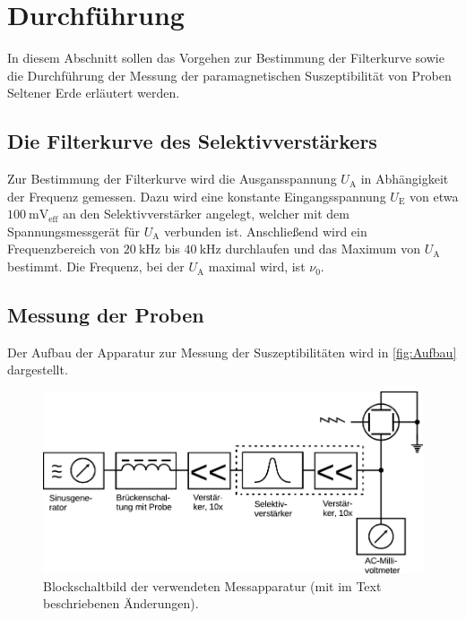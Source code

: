 \section{Durchführung}

    In diesem Abschnitt sollen
    das Vorgehen zur Bestimmung der Filterkurve
    sowie die Durchführung der Messung der paramagnetischen Suszeptibilität von Proben Seltener Erde
    erläutert werden.

\subsection{Die Filterkurve des Selektivverstärkers}

    Zur Bestimmung der Filterkurve wird die Ausgansspannung $U_\text{A}$ in Abhängigkeit der Frequenz gemessen.
    Dazu wird eine konstante Eingangsspannung $U_\text{E}$ von etwa $\SI{100}{\milli\volt_\text{eff}}$
    an den Selektivverstärker angelegt, welcher mit dem Spannungsmessgerät für $U_\text{A}$ verbunden ist.
    Anschließend wird ein Frequenzbereich von
    $\SI{20}{\kilo\hertz}$ bis $\SI{40}{\kilo\hertz}$
    durchlaufen
    und das Maximum von $U_\text{A}$ bestimmt.
    Die Frequenz, bei der $U_\text{A}$ maximal wird,
    ist $\nu_0$.

\subsection{Messung der Proben}

    Der Aufbau der Apparatur zur Messung der Suszeptibilitäten wird in \autoref{fig:Aufbau} dargestellt.\\

    \begin{figure}
      \centering
      \includegraphics[width=\textwidth]{content/img/Abb_4.pdf}
      \caption{Blockschaltbild der verwendeten Messapparatur (mit im Text beschriebenen Änderungen). \cite{versuchsanleitung}}
      \label{fig:Aufbau}
    \end{figure}

